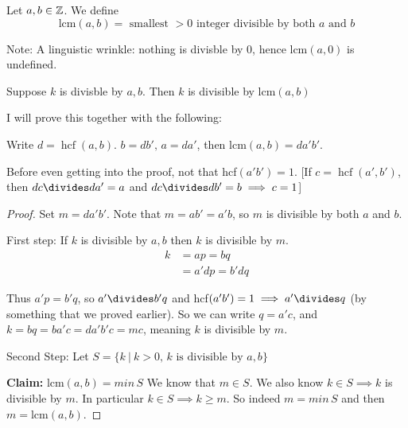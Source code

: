 \documentclass[twoside]{scrartcl}
\DeclareMathOperator{\hcf}{hcf}
\begin{document}
\vspace*{5pt}

\begin{definition}  
Let $a,b \in\mathbb{Z}$. We define 
\[\text{lcm}(a,b) = \mbox{ smallest $> 0$ integer divisible by both $a$ and $b$}\]	
\end{definition}

Note: A linguistic wrinkle: nothing is divisble by $0$, hence lcm$(a,0)$ is undefined. 

\begin{proposition}
Suppose $k$ is divisble by $a,b$. Then $k$ is divisible by lcm$(a,b)$	
\end{proposition}

I will prove this together with the following:

\begin{proposition}
Write $d = \hcf(a,b)$. $b = db',\, a = da'$, then $\text{lcm}(a,b) = da'b'$. 	
\end{proposition}

Before even getting into the proof, not that hcf$(a'b') = 1$. [If $c = \hcf(a',b')$, then $dc \divides da' = a$ and $dc \divides db' = b \implies c = 1$]

\begin{proof}
Set $m = da'b'$. Note that $m = ab' = a'b$, so $m$ is divisible by both $a$ and $b$. 

First step: If $k$ is divisible by $a,b$ then $k$ is divisible by $m$. 
\[
\begin{aligned}
  k &= ap = bq\\
  &= a'dp = b'dq
\end{aligned}
\]

Thus $a'p = b'q$, so $a'\divides b'q$ and hcf$(a'b') =1 \implies a'\divides q$ (by something that we proved earlier). So we can write $q = a'c$, and $
  k = bq = ba'c = da'b'c = mc$, meaning $k$ is divisible by $m$. 

Second Step: Let $S = \{k ~|~ k>0,\, k \text{ is divisible by } a,b\}$

\textbf{Claim:} lcm$(a,b) = min \,S$ We know that $m \in S$. We also know $k \in S \implies k$ is divisible by $m$. In particular $k \in S \implies k \geq m$. So indeed $m = min\,S$ and then $m = \text{lcm}(a,b)$. 
\end{proof}


\vspace*{5pt}
\end{document}
